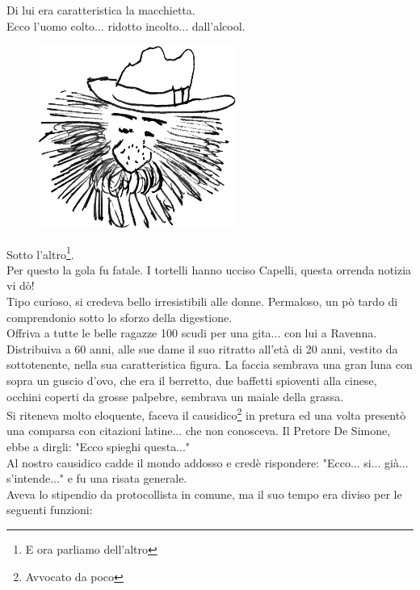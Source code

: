 \normalfont \normalsize
\noindent Di lui era caratteristica la macchietta.\\
Ecco l'uomo colto... ridotto incolto... dall'alcool.
 \begin{figure}[htb]
    \centering
    \includegraphics[height=6cm]{Capelli_Avvocato}
\end{figure}\newpage
{}
\noindent Sotto l'altro\footnote{E ora parliamo dell'altro}. \\Per questo la gola fu fatale. I tortelli hanno ucciso Capelli, questa orrenda notizia vi dò!\\
Tipo curioso, si credeva bello irresistibili alle donne. Permaloso, un pò tardo di comprendonio sotto lo sforzo della digestione.\\
Offriva a tutte le belle ragazze 100 scudi per una gita... con lui a Ravenna. Distribuiva a 60 anni, alle sue dame il suo ritratto all'età di 20 anni, vestito da sottotenente, nella sua caratteristica figura. La faccia sembrava una gran luna con sopra un guscio d'ovo, che era il berretto, due baffetti spioventi alla cinese, occhini coperti da grosse palpebre, sembrava un maiale della grassa. \\
Si riteneva molto eloquente, faceva il causidico\footnote{Avvocato da poco} in pretura ed una volta presentò una comparsa con citazioni latine... che non conosceva. Il Pretore De Simone, ebbe a dirgli: "Ecco spieghi questa..."\\
Al nostro causidico cadde il mondo addosso e credè rispondere: "Ecco... si... già... s'intende..." e fu una risata generale.\\
Aveva lo stipendio da protocollista in comune, ma il suo tempo era diviso per le seguenti funzioni:\\
